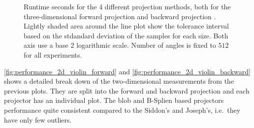 \begin{figure}[h]
	\centering


	\caption{Runtime seconds for the 4 different projection methods, both for the
		three-dimensional forward projection 
		and backward projection . Lightly
		shaded area around the line plot show the tolerance interval based on the stdandard
		deviation of the samples for each size. Both axis use a base 2 logarithmic scale.
		Number of angles is fixed to \(512\) for all experiments.}%
	\label{fig:performance_3d_lineplot}
\end{figure}

\autoref{fig:performance_2d_violin_forward} and \autoref{fig:performance_2d_violin_backward}
shows a detailed break down of the two-dimensional measurements from the previous plots. They are
split into the forward and backward projection and each projector has an individual plot. The blob
and B-Splien based projectors performance quite consistent compared to the Siddon's and Joseph's,
i.e.\ they have only few outliers.

